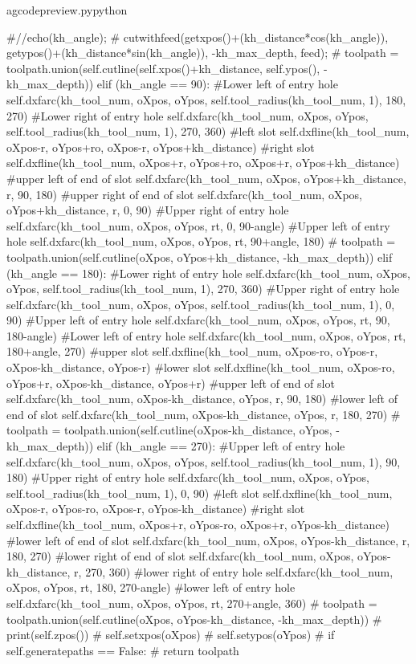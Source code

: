 \documentclass{ltxdoc}
\begin{document}
\begin{writecode}{a}{gcodepreview.py}{python}
{#//echo(kh_angle);
# cutwithfeed(getxpos()+(kh_distance*cos(kh_angle)), getypos()+(kh_distance*sin(kh_angle)), -kh_max_depth, feed);
#            toolpath = toolpath.union(self.cutline(self.xpos()+kh_distance, self.ypos(), -kh_max_depth))
        elif (kh_angle == 90):
#Lower left of entry hole
            self.dxfarc(kh_tool_num, oXpos, oYpos, self.tool_radius(kh_tool_num, 1), 180, 270)
#Lower right of entry hole
            self.dxfarc(kh_tool_num, oXpos, oYpos, self.tool_radius(kh_tool_num, 1), 270, 360)
#left slot
            self.dxfline(kh_tool_num, oXpos-r, oYpos+ro, oXpos-r, oYpos+kh_distance)
#right slot
            self.dxfline(kh_tool_num, oXpos+r, oYpos+ro, oXpos+r, oYpos+kh_distance)
#upper left of end of slot
            self.dxfarc(kh_tool_num, oXpos, oYpos+kh_distance, r, 90, 180)
#upper right of end of slot
            self.dxfarc(kh_tool_num, oXpos, oYpos+kh_distance, r, 0, 90)
#Upper right of entry hole
            self.dxfarc(kh_tool_num, oXpos, oYpos, rt, 0, 90-angle)
#Upper left of entry hole
            self.dxfarc(kh_tool_num, oXpos, oYpos, rt, 90+angle, 180)
#            toolpath = toolpath.union(self.cutline(oXpos, oYpos+kh_distance, -kh_max_depth))
        elif (kh_angle == 180):
#Lower right of entry hole
            self.dxfarc(kh_tool_num, oXpos, oYpos, self.tool_radius(kh_tool_num, 1), 270, 360)
#Upper right of entry hole
            self.dxfarc(kh_tool_num, oXpos, oYpos, self.tool_radius(kh_tool_num, 1), 0, 90)
#Upper left of entry hole
            self.dxfarc(kh_tool_num, oXpos, oYpos, rt, 90, 180-angle)
#Lower left of entry hole
            self.dxfarc(kh_tool_num, oXpos, oYpos, rt, 180+angle, 270)
#upper slot
            self.dxfline(kh_tool_num, oXpos-ro, oYpos-r, oXpos-kh_distance, oYpos-r)
#lower slot
            self.dxfline(kh_tool_num, oXpos-ro, oYpos+r, oXpos-kh_distance, oYpos+r)
#upper left of end of slot
            self.dxfarc(kh_tool_num, oXpos-kh_distance, oYpos, r, 90, 180)
#lower left of end of slot
            self.dxfarc(kh_tool_num, oXpos-kh_distance, oYpos, r, 180, 270)
#            toolpath = toolpath.union(self.cutline(oXpos-kh_distance, oYpos, -kh_max_depth))
        elif (kh_angle == 270):
#Upper left of entry hole
            self.dxfarc(kh_tool_num, oXpos, oYpos, self.tool_radius(kh_tool_num, 1), 90, 180)
#Upper right of entry hole
            self.dxfarc(kh_tool_num, oXpos, oYpos, self.tool_radius(kh_tool_num, 1), 0, 90)
#left slot
            self.dxfline(kh_tool_num, oXpos-r, oYpos-ro, oXpos-r, oYpos-kh_distance)
#right slot
            self.dxfline(kh_tool_num, oXpos+r, oYpos-ro, oXpos+r, oYpos-kh_distance)
#lower left of end of slot
            self.dxfarc(kh_tool_num, oXpos, oYpos-kh_distance, r, 180, 270)
#lower right of end of slot
            self.dxfarc(kh_tool_num, oXpos, oYpos-kh_distance, r, 270, 360)
#lower right of entry hole
            self.dxfarc(kh_tool_num, oXpos, oYpos, rt, 180, 270-angle)
#lower left of entry hole
            self.dxfarc(kh_tool_num, oXpos, oYpos, rt, 270+angle, 360)
#            toolpath = toolpath.union(self.cutline(oXpos, oYpos-kh_distance, -kh_max_depth))
#        print(self.zpos())
#        self.setxpos(oXpos)
#        self.setypos(oYpos)
#        if self.generatepaths == False:
#            return toolpath
            
}
\end{writecode}
\end{document}
